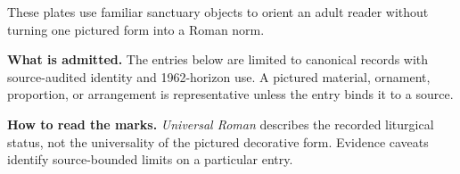 These plates use familiar sanctuary objects to orient an adult reader without
turning one pictured form into a Roman norm.

\textbf{What is admitted.} The entries below are limited to canonical records
with source-audited identity and 1962-horizon use. A pictured material,
ornament, proportion, or arrangement is representative unless the entry binds
it to a source.

\textbf{How to read the marks.} \emph{Universal Roman} describes the
recorded liturgical status, not the universality of the pictured decorative
form. Evidence caveats identify source-bounded limits on a particular entry.
